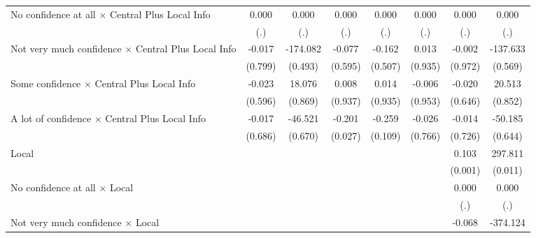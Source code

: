 {\begin{tabular}{l*{7}{c}}
No confidence at all $\times$ Central Plus Local Info&    0.000         &    0.000         &    0.000         &    0.000         &    0.000         &    0.000         &    0.000         \\
                &      (.)         &      (.)         &      (.)         &      (.)         &      (.)         &      (.)         &      (.)         \\
Not very much confidence $\times$ Central Plus Local Info&   -0.017         & -174.082         &   -0.077         &   -0.162         &    0.013         &   -0.002         & -137.633         \\
                &  (0.799)         &  (0.493)         &  (0.595)         &  (0.507)         &  (0.935)         &  (0.972)         &  (0.569)         \\
Some confidence $\times$ Central Plus Local Info&   -0.023         &   18.076         &    0.008         &    0.014         &   -0.006         &   -0.020         &   20.513         \\
                &  (0.596)         &  (0.869)         &  (0.937)         &  (0.935)         &  (0.953)         &  (0.646)         &  (0.852)         \\
A lot of confidence $\times$ Central Plus Local Info&   -0.017         &  -46.521         &   -0.201\sym{**} &   -0.259         &   -0.026         &   -0.014         &  -50.185         \\
                &  (0.686)         &  (0.670)         &  (0.027)         &  (0.109)         &  (0.766)         &  (0.726)         &  (0.644)         \\
Local           &                  &                  &                  &                  &                  &    0.103\sym{**} &  297.811\sym{**} \\
                &                  &                  &                  &                  &                  &  (0.001)         &  (0.011)         \\
No confidence at all $\times$ Local&                  &                  &                  &                  &                  &    0.000         &    0.000         \\
                &                  &                  &                  &                  &                  &      (.)         &      (.)         \\
Not very much confidence $\times$ Local&                  &                  &                  &                  &                  &   -0.068         & -374.124         \\

\end{tabular}}
